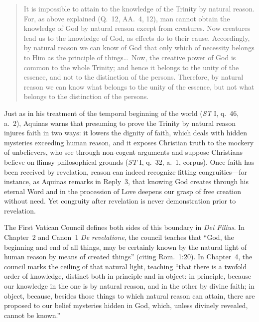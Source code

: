 \begin{quote}
It is impossible to attain to the knowledge of the Trinity by natural reason. For, as above explained (Q.\ 12, AA.\ 4, 12), man cannot obtain the knowledge of God by natural reason except from creatures. Now creatures lead us to the knowledge of God, as effects do to their cause. Accordingly, by natural reason we can know of God that only which of necessity belongs to Him as the principle of things\dots\ Now, the creative power of God is common to the whole Trinity; and hence it belongs to the unity of the essence, and not to the distinction of the persons. Therefore, by natural reason we can know what belongs to the unity of the essence, but not what belongs to the distinction of the persons.
\end{quote}

Just as in his treatment of the temporal beginning of the world (\emph{ST} I, q.\ 46, a.\ 2), Aquinas warns that presuming to prove the Trinity by natural reason injures faith in two ways: it lowers the dignity of faith, which deals with hidden mysteries exceeding human reason, and it exposes Christian truth to the mockery of unbelievers, who see through non-cogent arguments and suppose Christians believe on flimsy philosophical grounds (\emph{ST} I, q.\ 32, a.\ 1, corpus). Once faith has been received by revelation, reason can indeed recognize fitting congruities---for instance, as Aquinas remarks in Reply~3, that knowing God creates through his eternal Word and in the procession of Love deepens our grasp of free creation without need. Yet congruity after revelation is never demonstration prior to revelation.

The First Vatican Council defines both sides of this boundary in \emph{Dei Filius}. In Chapter~2 and Canon~1 \emph{De revelatione}, the council teaches that ``God, the beginning and end of all things, may be certainly known by the natural light of human reason by means of created things'' (citing Rom.\ 1:20). In Chapter~4, the council marks the ceiling of that natural light, teaching ``that there is a twofold order of knowledge, distinct both in principle and in object: in principle, because our knowledge in the one is by natural reason, and in the other by divine faith; in object, because, besides those things to which natural reason can attain, there are proposed to our belief mysteries hidden in God, which, unless divinely revealed, cannot be known.''

